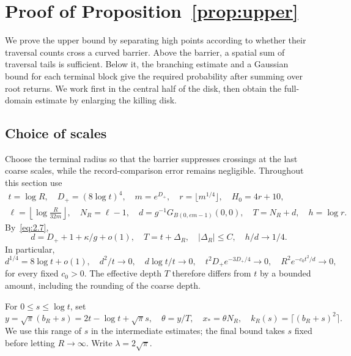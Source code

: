 \documentclass[11pt,a4paper]{article}
\numberwithin{equation}{section}
\theoremstyle{remark}
\begin{document}
\section{Proof of Proposition~\ref{prop:upper}}\label{sec:upper}
We prove the upper bound by separating high points according to whether their traversal counts cross a curved barrier. Above the barrier, a spatial sum of traversal tails is sufficient. Below it, the branching estimate and a Gaussian bound for each terminal block give the required probability after summing over root returns. We work first in the central half of the disk, then obtain the full-domain estimate by enlarging the killing disk.

\subsection{Choice of scales}\label{sec:upperscales}
Choose the terminal radius so that the barrier suppresses crossings at the last coarse scales, while the record-comparison error remains negligible. Throughout this section use
\begin{equation}\label{eq:4.1}
\begin{gathered}
t=\log R,\quad D_+=(8\log t)^4,\quad m=e^{D_+},\quad
r=\lfloor m^{1/4}\rfloor,\quad H_0=4r+10,\\
\ell=\left\lfloor\log\frac R{32m}\right\rfloor,\quad N_R=\ell-1,
\quad d=g^{-1}G_{B(0,em-1)}(0,0),\quad T=N_R+d,\quad h=\log r.
\end{gathered}
\end{equation}
By~\eqref{eq:2.7},
\begin{equation}\label{eq:4.2}
d=D_++1+\kappa/g+o(1),\quad T=t+\Delta_R,
\quad |\Delta_R|\le C,\quad h/d\to1/4.
\end{equation}
In particular,
\begin{equation}\label{eq:4.3}
d^{1/4}=8\log t+o(1),\quad d^2/t\to0,\quad d\log t/t\to0,
\quad t^2D_+e^{-3D_+/4}\to0,
\quad R^2e^{-c_0t^2/d}\to0,
\end{equation}
for every fixed $c_0>0$. The effective depth $T$ therefore differs from $t$ by a bounded amount, including the rounding of the coarse depth.

For $0\le s\le\log t$, set
\begin{equation}\label{eq:4.4}
y=\sqrt\pi(b_R+s)=2t-\log t+\sqrt\pi s,\quad
\theta=y/T,\quad x_*=\theta N_R,\quad k_R(s)=\lceil(b_R+s)^2\rceil.
\end{equation}
We use this range of $s$ in the intermediate estimates; the final bound takes $s$ fixed before letting $R\to\infty$. Write $\lambda=2\sqrt\pi$.
\end{document}

